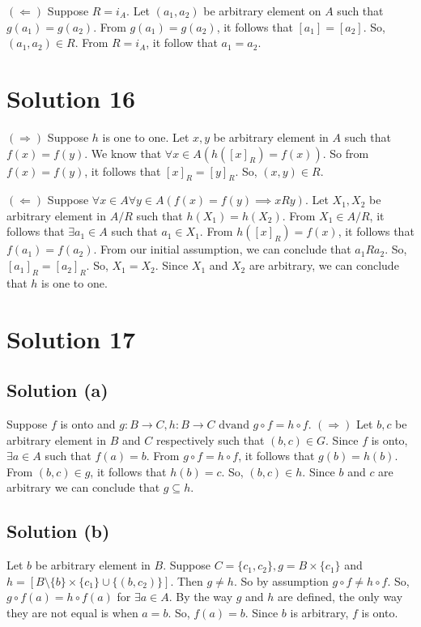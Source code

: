 \documentclass{article}
\begin{document}
$(\Leftarrow)$ Suppose $R = i_A$. Let $(a_1, a_2)$ be arbitrary
element on $A$ such that $g(a_1) = g(a_2)$. From $g(a_1) = g(a_2)$, it
follows that $[a_1] = [a_2]$. So, $(a_1, a_2) \in R$. From $R = i_A$,
it follow that $a_1 = a_2$.

\section{Solution 16}
$(\Rightarrow)$ Suppose $h$ is one to one. Let $x,y$ be arbitrary
element in $A$ such that $f(x) = f(y)$. We know that $\forall x \in
A(h([x]_R) = f(x))$. So from $f(x) = f(y)$, it follows that $[x]_R =
[y]_R$. So, $(x,y) \in R$.

$(\Leftarrow)$ Suppose $\forall x \in A \forall y \in A(f(x) = f(y)
\implies xRy)$. Let $X_1, X_2$ be arbitrary element in $A/R$ such that
$h(X_1) = h(X_2)$. From $X_1 \in A/R$, it follows that $\exists a_1
\in A$ such that $a_1 \in X_1$. From $h([x]_R) = f(x)$, it follows
that $f(a_1) = f(a_2)$. From our initial assumption, we can conclude
that $a_1Ra_2$. So, $[a_1]_R = [a_2]_R$. So, $X_1 = X_2$. Since $X_1$
and $X_2$ are arbitrary, we can conclude that $h$ is one to one.

\section{Solution 17}
\subsection{Solution (a)}
Suppose $f$ is onto and $g:B \to C, h:B \to C \text{ dvand } g \circ f
= h \circ f$.
$(\Rightarrow)$ Let $b,c$ be arbitrary element in $B$ and $C$
respectively such that $(b,c) \in G$. Since $f$ is onto, $\exists a
\in A$ such that $f(a) = b$. From $g \circ f = h \circ f$, it follows
that $g(b) = h(b)$. From $(b,c) \in g$, it follows that $h(b) = c$.
So, $(b,c) \in h$. Since $b$ and $c$ are arbitrary we can conclude
that $g \subseteq h$.

\subsection{Solution (b)}
Let $b$ be arbitrary element in $B$. Suppose $C = \{c_1, c_2\}, g = B
\times \{c_1\}$ and $h=[B \setminus \{b\} \times \{c_1\} \cup
\{(b,c_2)\}]$. Then $g \neq h$. So by assumption $g \circ f \neq h
\circ f$. So, $g \circ f(a) = h \circ f(a)$ for $\exists a \in A$. By
the way $g$ and $h$ are defined, the only way they are not equal is
when $a=b$. So, $f(a) = b$. Since $b$ is arbitrary, $f$ is onto.
\end{document}
